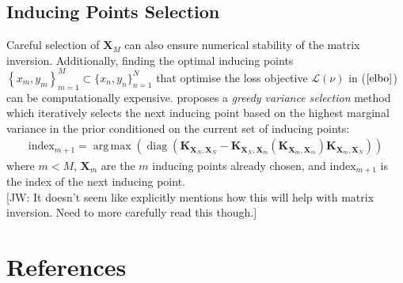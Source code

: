 \documentclass[twoside,11pt]{article}
\newcommand{\jw}[1]{{\color{gray} [JW: #1]}}
\newcommand{\diag}{\operatorname{diag}}
\DeclareMathOperator*{\argmax}{arg\,max}
\begin{document}
\subsection{Inducing Points Selection}
Careful selection of $\mathbf{X}_M$ can also ensure numerical stability of the matrix inversion. Additionally, finding the optimal inducing points $\left\{x_m, y_m\right\}_{m=1}^{M} \subset \{x_n, y_n\}_{n=1}^{N}$ that optimise the loss objective $\mathcal{L}(\nu)$ in ($\ref{elbo}$) can be computationally expensive. \cite{burt2020convergence} proposes a \textit{greedy variance selection} method which iteratively selects the next inducing point based on the highest marginal variance in the prior conditioned on the current set of inducing points:
\begin{align}
    \label{greedy-varaince-selection}
    \text{index}_{m+1} = \argmax \left(\diag \left(\mathbf{K}_{\mathbf{X}_N, \mathbf{X}_N} - \mathbf{K}_{\mathbf{X}_N, \mathbf{X}_{m}} \left(\mathbf{K}_{\mathbf{X}_{m}, \mathbf{X}_{m}} \right) \mathbf{K}_{\mathbf{X}_{m}, \mathbf{X}_N}\right)\right)
\end{align}
where $m < M$, $\mathbf{X}_{m}$ are the $m$ inducing points already chosen, and $\text{index}_{m+1}$ is the index of the next inducing point.
\\\jw{It doesn't seem like \cite{burt2020convergence} explicitly mentions how this will help with matrix inversion. Need to more carefully read this though.}

\begingroup
\let\clearpage\relax
\AtNextBibliography{\small}
\section*{References}
\printbibliography[heading=talikarng, title = {References}]
\endgroup
\end{document}
